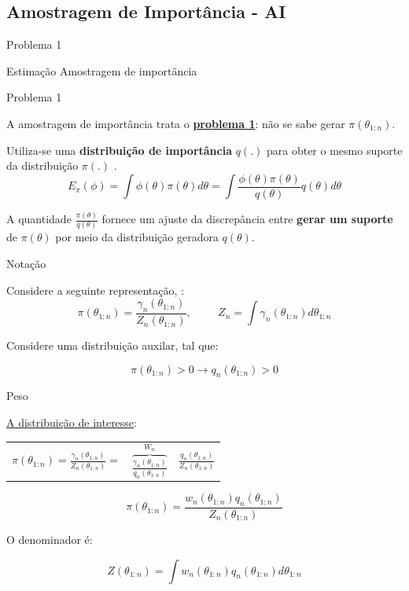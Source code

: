 \documentclass{beamer}
\begin{document}
\subsection{Amostragem de Importância - AI}

\begin{frame}{Problema 1}
    \begin{block}{Estimação}
      \Huge  Amostragem de importância
    \end{block}
\end{frame}


\begin{frame}{Problema 1}

A amostragem de importância trata o \textbf{\underline{problema 1}}: não se sabe gerar $\pi(\theta_{1:n})$.

\vspace{0.5cm}
\pause

Utiliza-se uma \textbf{distribuição de importância} $q(.)$ para obter o mesmo suporte da distribuição $\pi(.)$ .
$$
E_{\pi}(\phi)=\int \phi(\theta) \pi(\theta) d\theta = \int \frac{ \phi(\theta) \pi(\theta)}{q(\theta)} q(\theta) d\theta
$$

\pause
A quantidade $\frac{\pi(\theta)}{q(\theta)}$  fornece um ajuste da discrepância entre \textbf{gerar um suporte} de $\pi(\theta)$ por meio da distribuição geradora $q(\theta)$.

\end{frame}




\begin{frame}{Notação}

Considere a seguinte representação, \cite{doucet2}:
$$ \pi(\theta_{1:n}) = \frac{\gamma_n(\theta_{1:n})}{Z_n(\theta_{1:n})}, \hspace{1cm} Z_n = \int \gamma_n(\theta_{1:n}) d\theta_{1:n}$$

\pause

Considere uma distribuição auxilar, tal que:

$$ \pi(\theta_{1:n}) > 0 \rightarrow q_n(\theta_{1:n})>0$$


\end{frame}




\begin{frame}{Peso}

\underline{A distribuição de interesse}:
\begin{tabular}{ccc}
$ \pi(\theta_{1:n}) = \frac{\gamma_n(\theta_{1:n})}{Z_n(\theta_{1:n})}= $  & $ \overbrace{ \frac{\gamma_n(\theta_{1:n})}{q_n(\theta_{1:n})} }^{W_n} $  & $ \frac{q_n(\theta_{1:n})}{Z_n(\theta_{1:n})} $
\end{tabular}

\vspace{0.5cm}
$$ \pi(\theta_{1:n}) = \frac{w_n(\theta_{1:n})q_n(\theta_{1:n})}{Z_n(\theta_{1:n})} $$

\pause

O denominador é:

$$ Z(\theta_{1:n}) = \int w_n(\theta_{1:n})q_n(\theta_{1:n})d\theta_{1:n}$$

\end{frame}
\end{document}
